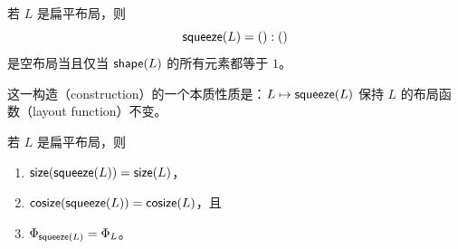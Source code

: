 \begin{example}
    若 $L$ 是扁平布局，则
    \[
    \mathsf{squeeze}(L) = ():()
    \]
    是空布局当且仅当 $\mathsf{shape}(L)$ 的所有元素都等于 $1$。
\end{example}


\noindent 这一构造（construction）的一个本质性质是：$L \mapsto \mathsf{squeeze}(L)$ 保持 $L$ 的布局函数（layout function）不变。

\begin{lemma}\label{squeezelemma}
    若 $L$ 是扁平布局，则
    \begin{enumerate}
    \item $\mathsf{size}(\mathsf{squeeze}(L)) = \mathsf{size}(L)$，
    \item $\mathsf{cosize}(\mathsf{squeeze}(L)) = \mathsf{cosize}(L)$，且
    \item $\Phi_{\mathsf{squeeze}(L)} = \Phi_L$。
    \end{enumerate}
\end{lemma}

